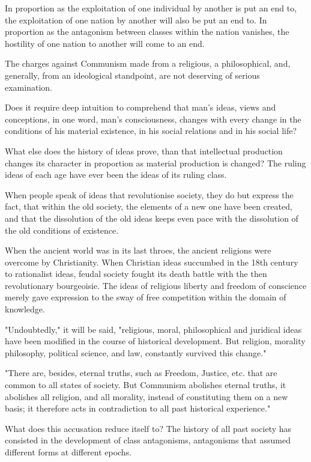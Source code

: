 \documentclass[, oneside]{article}   	%
\begin{document}
In proportion as the exploitation of one individual by another is put an end to, the exploitation of one nation by another will also be put an end to. In proportion as the antagonism between classes within the nation vanishes, the hostility of one nation to another will come to an end.

The charges against Communism made from a religious, a philosophical, and, generally, from an ideological standpoint, are not deserving of serious examination.

Does it require deep intuition to comprehend that man's ideas, views and conceptions, in one word, man's consciousness, changes with every change in the conditions of his material existence, in his social relations and in his social life?

What else does the history of ideas prove, than that intellectual production changes its character in proportion as material production is changed? The ruling ideas of each age have ever been the ideas of its ruling class.

When people speak of ideas that revolutionise society, they do but express the fact, that within the old society, the elements of a new one have been created, and that the dissolution of the old ideas keeps even pace with the dissolution of the old conditions of existence.

When the ancient world was in its last throes, the ancient religions were overcome by Christianity. When Christian ideas succumbed in the 18th century to rationalist ideas, feudal society fought its death battle with the then revolutionary bourgeoisie. The ideas of religious liberty and freedom of conscience merely gave expression to the sway of free competition within the domain of knowledge.

"Undoubtedly," it will be said, "religious, moral, philosophical and juridical ideas have been modified in the course of historical development. But religion, morality philosophy, political science, and law, constantly survived this change."

"There are, besides, eternal truths, such as Freedom, Justice, etc. that are common to all states of society. But Communism abolishes eternal truths, it abolishes all religion, and all morality, instead of constituting them on a new basis; it therefore acts in contradiction to all past historical experience."

What does this accusation reduce itself to? The history of all past society has consisted in the development of class antagonisms, antagonisms that assumed different forms at different epochs.
\end{document}
